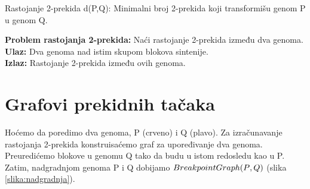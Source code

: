 \begin{definicija} {Rastojanje 2-prekida d(P,Q): Minimalni broj 2-prekida koji transformišu genom P u genom Q.}
\end{definicija}

\begin{tcolorbox} 
	\textbf{Problem rastojanja 2-prekida:} Naći rastojanje 2-prekida između dva genoma. \\
	\textbf{Ulaz:} Dva genoma nad istim skupom blokova
	sintenije. \\
	\textbf{Izlaz:} Rastojanje 2-prekida između ovih genoma.
\end{tcolorbox}




\section{Grafovi prekidnih tačaka}

Hoćemo da poredimo dva genoma, P (crveno) i Q (plavo). Za izračunavanje rastojanja 2-prekida konstruisaćemo graf za upoređivanje dva genoma. Preuredićemo blokove u genomu Q tako da budu u istom redosledu kao u P. Zatim, nadgradnjom genoma {\color{black}P} i {\color{black}Q} dobijamo $BreakpointGraph({\color{black}P}, {\color{black}Q})$ (slika \ref{slika:nadgradnja}).

